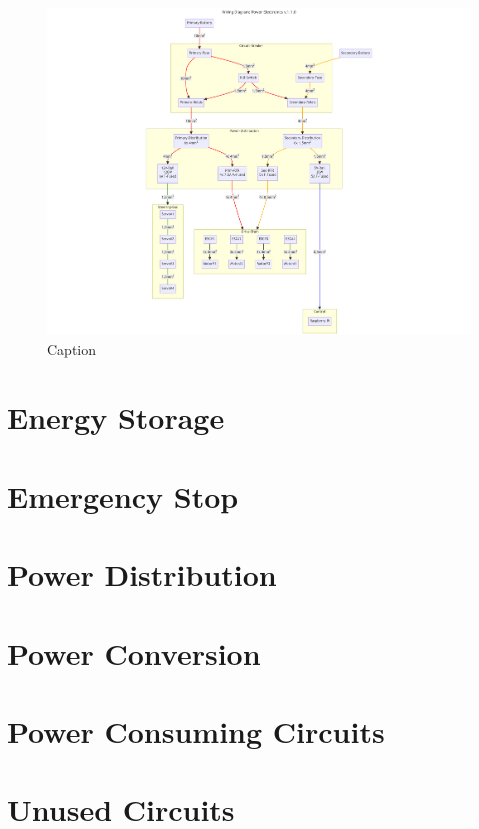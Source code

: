     
    \clearpage
    \begin{figure}

        \includegraphics[width=\textwidth]{contents/figures/wiring-diagram-p-v1.1.0.png}
        \caption{Caption}
        \label{wiring_power}
    \end{figure}

    




\section{Energy Storage}

\section{Emergency Stop}

\section{Power Distribution}

\section{Power Conversion}

\section{Power Consuming Circuits}

\section{Unused Circuits}

